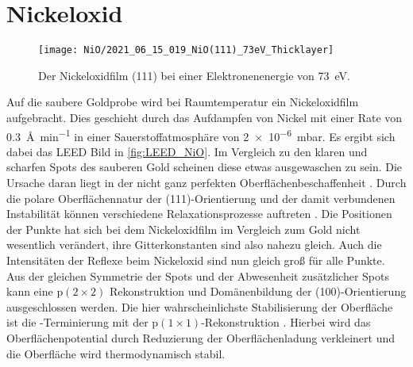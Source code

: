     \section{Nickeloxid}    
        \begin{figure}
            \centering
            \texttt{[image: NiO/2021\_06\_15\_019\_NiO(111)\_73eV\_Thicklayer]}
            \caption{Der Nickeloxidfilm (111) bei einer Elektronenenergie von \SI{73}{\electronvolt}.}
            \label{fig:LEED_NiO}
        \end{figure}
        Auf die saubere Goldprobe wird bei Raumtemperatur ein Nickeloxidfilm aufgebracht.
        Dies geschieht durch das Aufdampfen von Nickel mit einer Rate von \SI{0.3}{\angstrom\per\minute} in einer Sauerstoffatmosphäre von \SI{2e-6}{\milli\bar}.
        Es ergibt sich dabei das LEED Bild in \autoref{fig:LEED_NiO}.
        Im Vergleich zu den klaren und scharfen Spots des sauberen Gold scheinen diese etwas ausgewaschen zu sein.
        Die Ursache daran liegt in der nicht ganz perfekten Oberflächenbeschaffenheit \cite{NiO_34}.
        Durch die polare Oberflächennatur der (111)-Orientierung und der damit verbundenen Instabilität können verschiedene Relaxationsprozesse auftreten \cite{NiO_36, NiO_35, NiO_34, NiO_27, NiO_10}.
        Die Positionen der Punkte hat sich bei dem Nickeloxidfilm im Vergleich zum Gold nicht wesentlich verändert, ihre Gitterkonstanten sind also nahezu gleich.
        Auch die Intensitäten der Reflexe beim Nickeloxid sind nun gleich groß für alle Punkte.
        Aus der gleichen Symmetrie der Spots und der Abwesenheit zusätzlicher Spots kann eine $\text{p}(2 \times 2)$ Rekonstruktion \cite{NiO_37} und Domänenbildung der (100)-Orientierung \cite{NiO_36} ausgeschlossen werden.
        Die hier wahrscheinlichste Stabilisierung der Oberfläche ist die -Terminierung mit der $\text{p}(1 \times 1)$-Rekonstruktion \cite{NiO_35}.
        Hierbei wird das Oberflächenpotential durch Reduzierung der Oberflächenladung verkleinert und die Oberfläche wird thermodynamisch stabil.

